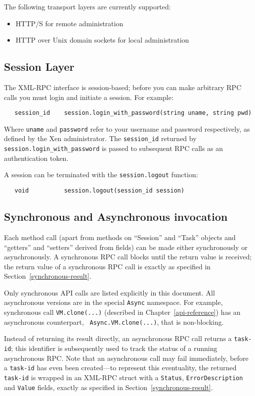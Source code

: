 The following transport layers are currently supported:
\begin{itemize}
\item HTTP/S for remote administration
\item HTTP over Unix domain sockets for local administration
\end{itemize}

\subsection{Session Layer}

The XML-RPC interface is session-based; before you can make arbitrary RPC calls
you must login and initiate a session. For example:
\begin{verbatim}
   session_id    session.login_with_password(string uname, string pwd)
\end{verbatim}
Where {\tt uname} and {\tt password} refer to your username and password
respectively, as defined by the Xen administrator.
The {\tt session\_id} returned by {\tt session.login\_with\_password} is passed
to subsequent RPC calls as an authentication token.

A session can be terminated with the {\tt session.logout} function:
\begin{verbatim}
   void          session.logout(session_id session)
\end{verbatim}

\subsection{Synchronous and Asynchronous invocation}

Each method call (apart from methods on ``Session'' and ``Task'' objects 
and ``getters'' and ``setters'' derived from fields)
can be made either synchronously or asynchronously.
A synchronous RPC call blocks until the
return value is received; the return value of a synchronous RPC call is
exactly as specified in Section~\ref{synchronous-result}.

Only synchronous API calls are listed explicitly in this document. 
All asynchronous versions are in the special {\tt Async} namespace.
For example, synchronous call {\tt VM.clone(...)}
(described in Chapter~\ref{api-reference})
has an asynchronous counterpart, {\tt
Async.VM.clone(...)}, that is non-blocking.

Instead of returning its result directly, an asynchronous RPC call
returns a {\tt task-id}; this identifier is subsequently used
to track the status of a running asynchronous RPC. Note that an asynchronous
call may fail immediately, before a {\tt task-id} has even been created---to
represent this eventuality, the returned {\tt task-id}
is wrapped in an XML-RPC struct with a {\tt Status}, {\tt ErrorDescription} and
{\tt Value} fields, exactly as specified in Section~\ref{synchronous-result}.

